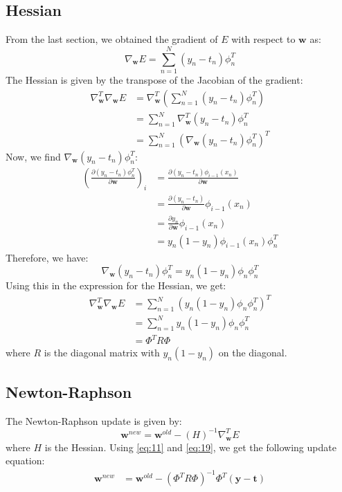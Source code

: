 \documentclass[a4paper, 11pt]{article}
\begin{document}
\subsection{Hessian}
From the last section, we obtained the gradient of $E$ with respect to $\textbf{w}$ as:
$$\nabla_{\textbf{w}} E = \sum_{n=1}^N (y_n - t_n) \phi_n^T$$
The Hessian is given by the transpose of the Jacobian of the gradient:
\begin{align}
    \nabla_{\textbf{w}}^T \nabla_{\textbf{w}} E &= \nabla_{\textbf{w}}^T \left(\sum_{n=1}^N (y_n - t_n) \phi_n^T\right) \\
    &= \sum_{n=1}^N \nabla_{\textbf{w}}^T (y_n - t_n) \phi_n^T \\
    &= \sum_{n=1}^N (\nabla_{\textbf{w}} (y_n - t_n) \phi_n^T)^T 
\end{align}
Now, we find $\nabla_{\textbf{w}} (y_n - t_n) \phi_n^T$:
\begin{align}
    \left(\frac{\partial (y_n - t_n) \phi_n^T}{\partial \textbf{w}} \right)_{i} &= \frac{\partial (y_n - t_n) \phi_{i-1}(x_n)}{\partial \textbf{w}} \\
    &= \frac{\partial (y_n - t_n)}{\partial \textbf{w}} \phi_{i-1}(x_n) \\
    &= \frac{\partial y_n}{\partial \textbf{w}} \phi_{i-1}(x_n) \\
    &= y_n(1-y_n) \phi_{i-1}(x_n) \phi_n^T
\end{align}
Therefore, we have:
$$ \nabla_{\textbf{w}} (y_n - t_n) \phi_n^T = y_n(1-y_n) \phi_n \phi_n^T$$
Using this in the expression for the Hessian, we get:
\begin{align}
    \nabla_{\textbf{w}}^T \nabla_{\textbf{w}} E &= \sum_{n=1}^N (y_n(1-y_n) \phi_n \phi_n^T)^T \\
    &= \sum_{n=1}^N y_n(1-y_n) \phi_n \phi_n^T \\
    &= \Phi^T R \Phi \label{eq:19}
\end{align}
where $R$ is the diagonal matrix with $y_n(1-y_n)$ on the diagonal.

\subsection{Newton-Raphson}
The Newton-Raphson update is given by:
$$\textbf{w}^{new} = \textbf{w}^{old} - (H)^{-1} \nabla_{\textbf{w}}^T E$$
where $H$ is the Hessian. Using \eqref{eq:11} and \eqref{eq:19}, we get the following update equation:
\begin{align}
    \textbf{w}^{new} &= \textbf{w}^{old} - (\Phi^T R \Phi)^{-1} \Phi^T  (\textbf{y} - \textbf{t}) 
\end{align}
\end{document}
